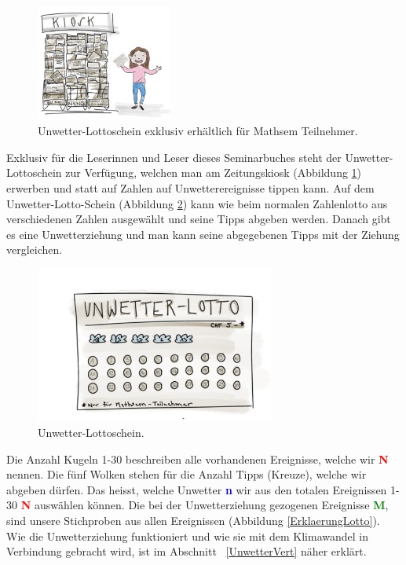 \begin{refsection}
\begin{figure}
\centering
\includegraphics[width=0.4\textwidth]{extrem/Kiosk.pdf}
\caption{Unwetter-Lottoschein exklusiv erhältlich für Mathsem Teilnehmer.}
\label{Kiosk}
\end{figure}

Exklusiv für die Leserinnen und Leser dieses Seminarbuches steht der Unwetter-Lottoschein zur Verfügung, welchen man am Zeitungskiosk (Abbildung \ref{Kiosk}) erwerben und statt auf Zahlen auf Unwetterereignisse tippen kann. Auf dem Unwetter-Lotto-Schein (Abbildung \ref{Lottoschein}) kann wie beim normalen Zahlenlotto aus verschiedenen Zahlen ausgewählt und seine Tipps abgeben werden. Danach gibt es eine Unwetterziehung und man kann seine abgegebenen Tipps mit der Ziehung vergleichen.

\begin{figure}
\centering
\includegraphics[width=0.7\textwidth]{extrem/Lottoschein.pdf}
\caption{Unwetter-Lottoschein.}
\label{Lottoschein}
\end{figure}

Die Anzahl Kugeln 1-30 beschreiben alle vorhandenen Ereignisse, welche wir \textcolor{red}{\textbf{N}} nennen. Die fünf Wolken stehen für die Anzahl Tipps (Kreuze), welche wir abgeben dürfen. Das heisst, welche Unwetter \textcolor{blue}{\textbf{n}} wir aus den totalen Ereignissen 1-30 \textcolor{red}{\textbf{N}} auswählen können. Die bei der Unwetterziehung gezogenen Ereignisse \textcolor{green}{\textbf{M}}, sind unsere Stichproben aus allen Ereignissen (Abbildung \ref{ErklaerungLotto}). Wie die Unwetterziehung funktioniert und wie sie mit dem Klimawandel in Verbindung gebracht wird, ist im Abschnitt ~\ref{UnwetterVert} näher erklärt.


\end{refsection}
